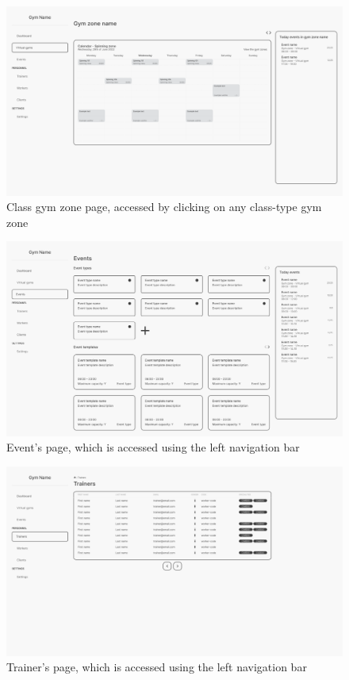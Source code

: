 \documentclass[a4paper, 12pt, oneside]{book}
\begin{document}
\begin{figure}[H]
	\centering
	\includegraphics[width=\textwidth]{assets/ui/class-gym-zone.png}
	\caption{Class gym zone page, accessed by clicking on any class-type gym zone}
\end{figure}
\begin{figure}[H]
	\centering
	\includegraphics[width=\textwidth]{assets/ui/events.png}
	\caption{Event's page, which is accessed using the left navigation bar}
\end{figure}
\begin{figure}[H]
	\centering
	\includegraphics[width=\textwidth]{assets/ui/trainers.png}
	\caption{Trainer's page, which is accessed using the left navigation bar}
\end{figure}
\end{document}
